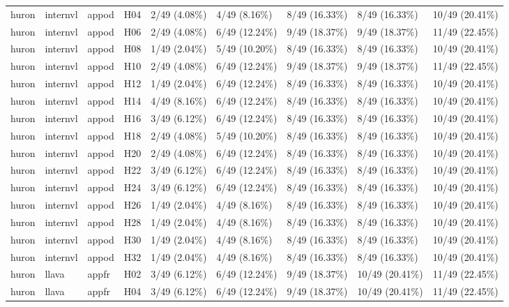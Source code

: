 \begin{longtable}{lllllllll}
huron & internvl & appod & H04 & 2/49 (4.08\%) & 4/49 (8.16\%) & 8/49 (16.33\%) & 8/49 (16.33\%) & 10/49 (20.41\%) \\
huron & internvl & appod & H06 & 2/49 (4.08\%) & 6/49 (12.24\%) & 9/49 (18.37\%) & 9/49 (18.37\%) & 11/49 (22.45\%) \\
huron & internvl & appod & H08 & 1/49 (2.04\%) & 5/49 (10.20\%) & 8/49 (16.33\%) & 8/49 (16.33\%) & 10/49 (20.41\%) \\
huron & internvl & appod & H10 & 2/49 (4.08\%) & 6/49 (12.24\%) & 9/49 (18.37\%) & 9/49 (18.37\%) & 11/49 (22.45\%) \\
huron & internvl & appod & H12 & 1/49 (2.04\%) & 6/49 (12.24\%) & 8/49 (16.33\%) & 8/49 (16.33\%) & 10/49 (20.41\%) \\
huron & internvl & appod & H14 & 4/49 (8.16\%) & 6/49 (12.24\%) & 8/49 (16.33\%) & 8/49 (16.33\%) & 10/49 (20.41\%) \\
huron & internvl & appod & H16 & 3/49 (6.12\%) & 6/49 (12.24\%) & 8/49 (16.33\%) & 8/49 (16.33\%) & 10/49 (20.41\%) \\
huron & internvl & appod & H18 & 2/49 (4.08\%) & 5/49 (10.20\%) & 8/49 (16.33\%) & 8/49 (16.33\%) & 10/49 (20.41\%) \\
huron & internvl & appod & H20 & 2/49 (4.08\%) & 6/49 (12.24\%) & 8/49 (16.33\%) & 8/49 (16.33\%) & 10/49 (20.41\%) \\
huron & internvl & appod & H22 & 3/49 (6.12\%) & 6/49 (12.24\%) & 8/49 (16.33\%) & 8/49 (16.33\%) & 10/49 (20.41\%) \\
huron & internvl & appod & H24 & 3/49 (6.12\%) & 6/49 (12.24\%) & 8/49 (16.33\%) & 8/49 (16.33\%) & 10/49 (20.41\%) \\
huron & internvl & appod & H26 & 1/49 (2.04\%) & 4/49 (8.16\%) & 8/49 (16.33\%) & 8/49 (16.33\%) & 10/49 (20.41\%) \\
huron & internvl & appod & H28 & 1/49 (2.04\%) & 4/49 (8.16\%) & 8/49 (16.33\%) & 8/49 (16.33\%) & 10/49 (20.41\%) \\
huron & internvl & appod & H30 & 1/49 (2.04\%) & 4/49 (8.16\%) & 8/49 (16.33\%) & 8/49 (16.33\%) & 10/49 (20.41\%) \\
huron & internvl & appod & H32 & 1/49 (2.04\%) & 4/49 (8.16\%) & 8/49 (16.33\%) & 8/49 (16.33\%) & 10/49 (20.41\%) \\
huron & llava & appfr & H02 & 3/49 (6.12\%) & 6/49 (12.24\%) & 9/49 (18.37\%) & 10/49 (20.41\%) & 11/49 (22.45\%) \\
huron & llava & appfr & H04 & 3/49 (6.12\%) & 6/49 (12.24\%) & 9/49 (18.37\%) & 10/49 (20.41\%) & 11/49 (22.45\%) \\

\end{longtable}
